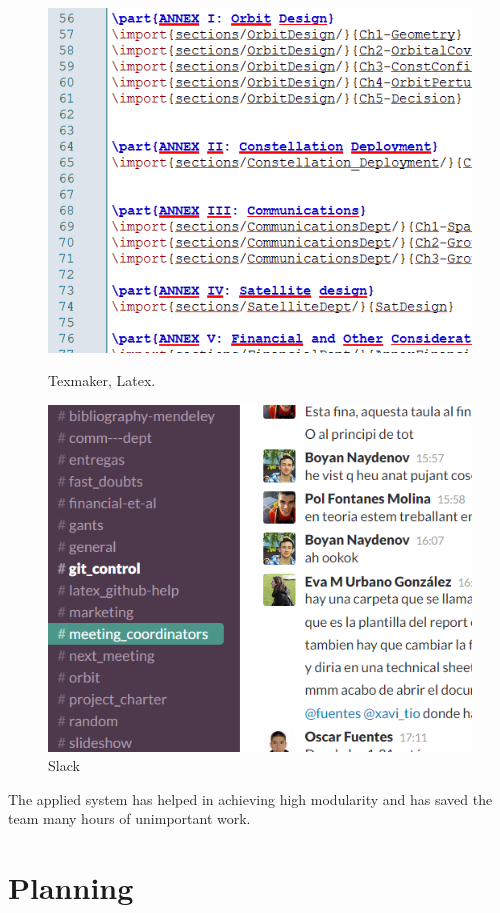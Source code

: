 \begin{figure}[H]
%
\includegraphics[width=\linewidth]{latex.png}
\caption{Texmaker, Latex.}\label{fig:latex}
\endminipage
{}%
\includegraphics[width=\linewidth]{slack.png}
\caption{Slack}\label{fig:slack}
\endminipage
\end{figure}

The applied system has helped in achieving high modularity and has saved the team many hours of unimportant work.

\section{Planning}

